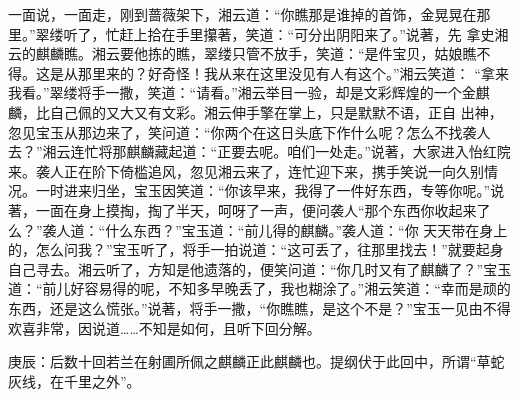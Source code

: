 \begin{parag}


    一面说，一面走，刚到蔷薇架下，湘云道：“你瞧那是谁掉的首饰，金晃晃在那里。”翠缕听了，忙赶上拾在手里攥著，笑道：“可分出阴阳来了。”说著，先 拿史湘云的麒麟瞧。湘云要他拣的瞧，翠缕只管不放手，笑道：“是件宝贝，姑娘瞧不得。这是从那里来的？好奇怪！我从来在这里没见有人有这个。”湘云笑道： “拿来我看。”翠缕将手一撒，笑道：“请看。”湘云举目一验，却是文彩辉煌的一个金麒麟，比自己佩的又大又有文彩。湘云伸手擎在掌上，只是默默不语，正自 出神，忽见宝玉从那边来了，笑问道：“你两个在这日头底下作什么呢？怎么不找袭人去？”湘云连忙将那麒麟藏起道：“正要去呢。咱们一处走。”说著，大家进入怡红院来。袭人正在阶下倚槛追风，忽见湘云来了，连忙迎下来，携手笑说一向久别情况。一时进来归坐，宝玉因笑道：“你该早来，我得了一件好东西，专等你呢。”说著，一面在身上摸掏，掏了半天，呵呀了一声，便问袭人“那个东西你收起来了么？”袭人道：“什么东西？”宝玉道：“前儿得的麒麟。”袭人道：“你 天天带在身上的，怎么问我？”宝玉听了，将手一拍说道：“这可丢了，往那里找去！”就要起身自己寻去。湘云听了，方知是他遗落的，便笑问道：“你几时又有了麒麟了？”宝玉道：“前儿好容易得的呢，不知多早晚丢了，我也糊涂了。”湘云笑道：“幸而是顽的东西，还是这么慌张。”说著，将手一撒，“你瞧瞧，是这个不是？”宝玉一见由不得欢喜非常，因说道……不知是如何，且听下回分解。
\end{parag}

\begin{parag}

    \begin{note}庚辰：后数十回若兰在射圃所佩之麒麟正此麒麟也。提纲伏于此回中，所谓“草蛇灰线，在千里之外”。\end{note}
\end{parag}

